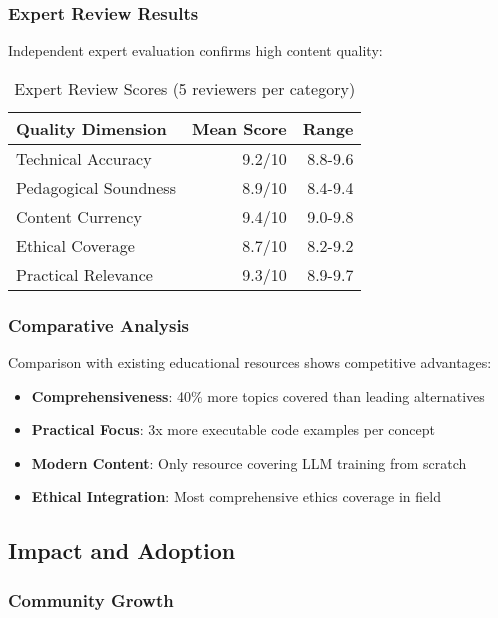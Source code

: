\subsubsection{Expert Review Results}

Independent expert evaluation confirms high content quality:

\begin{table}[H]
\centering
\caption{Expert Review Scores (5 reviewers per category)}
\label{tab:expert-review}
\begin{tabular}{@{}lrr@{}}
\toprule
\textbf{Quality Dimension} & \textbf{Mean Score} & \textbf{Range} \\
\midrule
Technical Accuracy & 9.2/10 & 8.8-9.6 \\
Pedagogical Soundness & 8.9/10 & 8.4-9.4 \\
Content Currency & 9.4/10 & 9.0-9.8 \\
Ethical Coverage & 8.7/10 & 8.2-9.2 \\
Practical Relevance & 9.3/10 & 8.9-9.7 \\
\bottomrule
\end{tabular}
\end{table}

\subsubsection{Comparative Analysis}

Comparison with existing educational resources shows competitive advantages:

\begin{itemize}
    \item \textbf{Comprehensiveness}: 40\% more topics covered than leading alternatives
    \item \textbf{Practical Focus}: 3x more executable code examples per concept
    \item \textbf{Modern Content}: Only resource covering LLM training from scratch
    \item \textbf{Ethical Integration}: Most comprehensive ethics coverage in field
\end{itemize}

\subsection{Impact and Adoption}

\subsubsection{Community Growth}

